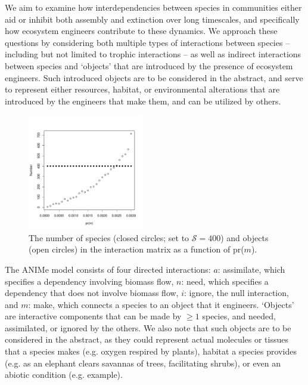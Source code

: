 \documentclass[twocolumn,preprintnumbers,amsmath,amssymb,superscriptaddress]{revtex4}
\begin{document}
We aim to examine how interdependencies between species in communities either aid or inhibit both assembly and extinction over long timescales, and specifically how ecosystem engineers contribute to these dynamics.
We approach these questions by considering both multiple types of interactions between species -- including but not limited to trophic interactions --  as well as indirect interactions between species and `objects' that are introduced by the presence of ecosystem engineers.
Such introduced objects are to be considered in the abstract, and serve to represent either resources, habitat, or environmental alterations that are introduced by the engineers that make them, and can be utilized by others. 


\begin{figure}
\centering
\includegraphics[width=0.45\textwidth]{fig_spob.pdf}
\caption{
The number of species (closed circles; set to $\mathcal S=400$) and objects (open circles) in the interaction matrix as a function of pr($m$).
}
\label{fig_spob}
\end{figure} 


The ANIMe model consists of four directed interactions:
$a$: assimilate, which specifies a dependency involving biomass flow,
$n$: need, which specifies a dependency that does not involve biomass flow,
$i$: ignore, the null interaction, and
$m$: make, which connects a species to an object that it engineers. 
`Objects' are interactive components that can be made by $\geq 1$ species, and needed, assimilated, or ignored by the others.
We also note that such objects are to be considered in the abstract, as they could represent actual molecules or tissues that a species makes (e.g. oxygen respired by plants), habitat a species provides (e.g. as an elephant clears savannas of trees, facilitating shrubs), or even an abiotic condition (e.g. example). 
\end{document}
